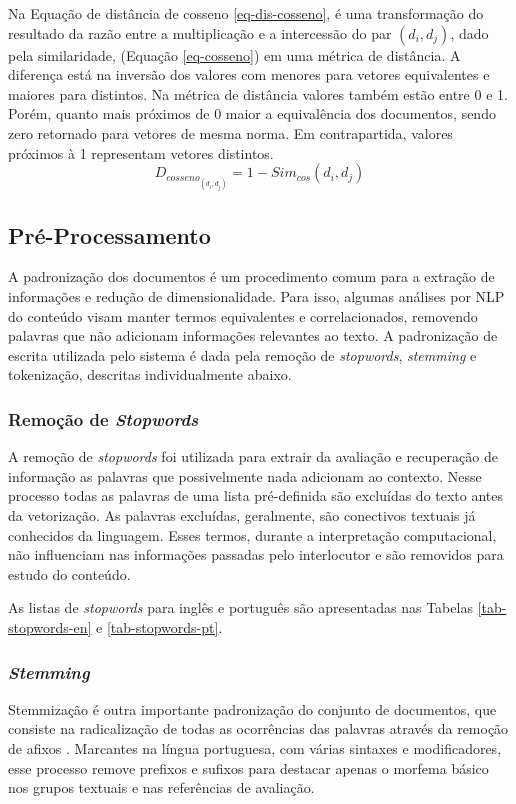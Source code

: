 Na Equação de distância de cosseno \ref{eq-dis-cosseno}, é uma transformação do resultado da razão entre a multiplicação e a intercessão do par $(d_{i},d_{j})$, dado pela similaridade, (Equação  \ref{eq-cosseno}) em uma métrica de distância. A diferença está na inversão dos valores com menores para vetores equivalentes e maiores para distintos. Na métrica de distância valores também estão entre 0 e 1. Porém, quanto mais próximos de 0 maior a equivalência dos documentos, sendo zero retornado para vetores de mesma norma. Em contrapartida, valores próximos à 1 representam vetores distintos.
\begin{equation}
D_{cosseno_{(d_{i}, d_{j})}} = 1 - Sim_{cos}(d_{i},d_{j})
\label{eq-dis-cosseno}
\end{equation}

\subsection{Pré-Processamento}
A padronização dos documentos é um procedimento comum para a extração de informações e redução de dimensionalidade. Para isso, algumas análises por NLP do conteúdo visam manter termos equivalentes e correlacionados, removendo palavras que não adicionam informações relevantes ao texto. A padronização de escrita utilizada pelo sistema é dada pela remoção de \textit{stopwords}, \textit{stemming} e tokenização, descritas individualmente abaixo.

\subsubsection{Remoção de {\it Stopwords}}
A remoção de \textit{stopwords} \cite{manning1999} foi utilizada para extrair da avaliação e recuperação de informação as palavras que possivelmente nada adicionam ao contexto. Nesse processo todas as palavras de uma lista pré-definida são excluídas do texto antes da vetorização. As palavras excluídas, geralmente, são conectivos textuais já conhecidos da linguagem. Esses termos, durante a interpretação computacional, não influenciam nas informações passadas pelo interlocutor e são removidos para estudo do conteúdo.

As listas de \textit{stopwords} para inglês e português são apresentadas nas Tabelas \ref{tab-stopwords-en} e \ref{tab-stopwords-pt}.

\subsubsection{{\it Stemming}}
Stemmização é outra importante padronização do conjunto de documentos, que consiste na radicalização de todas as ocorrências das palavras através da remoção de afixos \cite{weiss2010}. Marcantes na língua portuguesa, com várias sintaxes e modificadores, esse processo remove prefixos e sufixos para destacar apenas o morfema básico nos grupos textuais e nas referências de avaliação.

